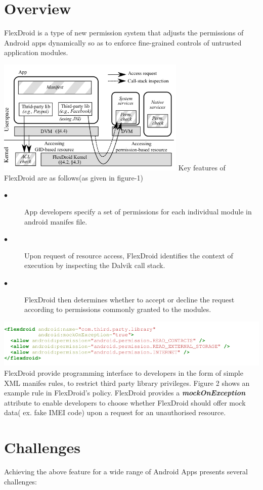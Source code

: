 \documentclass[11pt]{report}
\begin{document}
\section{Overview}
\par FlexDroid is a type of new permission system that adjusts the permissions of Android apps dynamically so as to enforce fine-grained controls of untrusted application modules.\par
\includegraphics[width=90mm]{./images/fig-1.png}\newline
Key features of FlexDroid are as follows(as given in figure-1)
\begin{description}
 \item[$\bullet$] App developers specify a set of permissions for each individual module in android manifes file.
 \item[$\bullet$] Upon request of resource access,  FlexDroid identifies the context of execution by inspecting the Dalvik call stack.
 \item[$\bullet$] FlexDroid then determines whether to accept or decline the request according to permissions commonly granted to the modules.
\end{description}
\includegraphics[width=150mm]{./images/fig-2.png}\newline
FlexDroid provide programming interface to developers in the form of simple XML manifes rules, to restrict third party library privileges. Figure 2 shows an 
example rule in FlexDroid’s policy. FlexDroid provides a \textbf{\it mockOnException}  attribute to enable developers to choose whether FlexDroid should offer mock data( ex. fake IMEI code) 
upon a request for an unauthorised resource.
\section{Challenges}
\par Achieving the above feature for a wide range of Android Apps presents several challenges:
\end{document}
